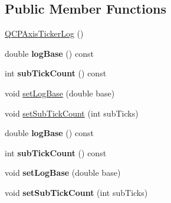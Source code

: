 \subsection*{Public Member Functions}
\begin{DoxyCompactItemize}
\item 
\hyperlink{class_q_c_p_axis_ticker_log_af3cb86ea5eef2023c0b96b5260c4cbdf}{Q\+C\+P\+Axis\+Ticker\+Log} ()
\item 
double {\bfseries log\+Base} () const \hypertarget{class_q_c_p_axis_ticker_log_abba2a2aead5551b433940fa39a53ca09}{}\label{class_q_c_p_axis_ticker_log_abba2a2aead5551b433940fa39a53ca09}

\item 
int {\bfseries sub\+Tick\+Count} () const \hypertarget{class_q_c_p_axis_ticker_log_ad7a648bfa6ee3ad33b1c43bd7b84e9ab}{}\label{class_q_c_p_axis_ticker_log_ad7a648bfa6ee3ad33b1c43bd7b84e9ab}

\item 
void \hyperlink{class_q_c_p_axis_ticker_log_ac6e3b4e03baea3816f898869ab9751ef}{set\+Log\+Base} (double base)
\item 
void \hyperlink{class_q_c_p_axis_ticker_log_ad51989c798c0cfd50936d77aac57c56a}{set\+Sub\+Tick\+Count} (int sub\+Ticks)
\item 
double {\bfseries log\+Base} () const \hypertarget{class_q_c_p_axis_ticker_log_abba2a2aead5551b433940fa39a53ca09}{}\label{class_q_c_p_axis_ticker_log_abba2a2aead5551b433940fa39a53ca09}

\item 
int {\bfseries sub\+Tick\+Count} () const \hypertarget{class_q_c_p_axis_ticker_log_ad7a648bfa6ee3ad33b1c43bd7b84e9ab}{}\label{class_q_c_p_axis_ticker_log_ad7a648bfa6ee3ad33b1c43bd7b84e9ab}

\item 
void {\bfseries set\+Log\+Base} (double base)\hypertarget{class_q_c_p_axis_ticker_log_ac6e3b4e03baea3816f898869ab9751ef}{}\label{class_q_c_p_axis_ticker_log_ac6e3b4e03baea3816f898869ab9751ef}

\item 
void {\bfseries set\+Sub\+Tick\+Count} (int sub\+Ticks)\hypertarget{class_q_c_p_axis_ticker_log_ad51989c798c0cfd50936d77aac57c56a}{}\label{class_q_c_p_axis_ticker_log_ad51989c798c0cfd50936d77aac57c56a}

\end{DoxyCompactItemize}

